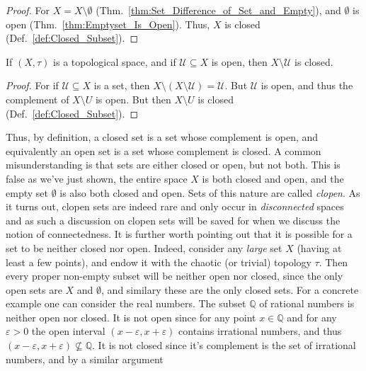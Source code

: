     \begin{proof}
        For $X=X\setminus\emptyset$
        (Thm.~\ref{thm:Set_Difference_of_Set_and_Empty}), and $\emptyset$ is
        open (Thm.~\ref{thm:Emptyset_Is_Open}). Thus, $X$ is closed
        (Def.~\ref{def:Closed_Subset}).
    \end{proof}
    \begin{theorem}
        \label{thm:Complement_of_Open_is_Closed}%
        If $(X,\tau)$ is a topological space, and if $\mathcal{U}\subseteq{X}$
        is open, then $X\setminus\mathcal{U}$ is closed.
    \end{theorem}
    \begin{proof}
        For if $\mathcal{U}\subseteq{X}$ is a set, then
        $X\setminus(X\setminus\mathcal{U})=\mathcal{U}$. But $\mathcal{U}$ is
        open, and thus the complement of $X\setminus{U}$ is open. But then
        $X\setminus{U}$ is closed (Def.~\ref{def:Closed_Subset}).
    \end{proof}
    Thus, by definition, a closed set is a set whose complement is open, and
    equivalently an open set is a set whose complement is closed. A common
    misunderstanding is that sets are either closed or open, but not both. This
    is false as we've just shown, the entire space $X$ is both closed and open,
    and the empty set $\emptyset$ is also both closed and open. Sets of this
    nature are called \textit{clopen}. As it turns out, clopen
    sets are indeed rare and only occur in \textit{disconnected}
    spaces and
    as such a discussion on clopen sets will be saved for when we discuss the
    notion of connectedness. It is further worth pointing out that it is
    possible for a set to be neither closed nor open. Indeed, consider any
    \textit{large} set $X$ (having at least a few points), and endow it with the
    chaotic (or trivial) topology $\tau$. Then every proper non-empty subset
    will be neither open nor closed, since the only open sets are $X$ and
    $\emptyset$, and similary these are the only closed sets. For a concrete
    example one can consider the real numbers. The subset $\mathbb{Q}$ of
    rational numbers is neither open nor closed. It is not open since
    for any point $x\in\mathbb{Q}$ and for any $\varepsilon>0$ the open interval
    $(x-\varepsilon,x+\varepsilon)$ contains irrational numbers, and thus
    $(x-\varepsilon,x+\varepsilon)\nsubseteq\mathbb{Q}$. It is not closed since
    it's complement is the set of irrational numbers, and by a similar argument
